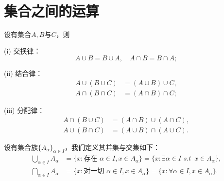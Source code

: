 \documentclass[../../main.tex]{subfiles}
\begin{document}
\section{集合之间的运算}

\begin{theorem}\label{theorem:集合运算的基本性质}
设有集合\(A,B\)与\(C\)，则

(i) 交换律：
\[A\cup B = B\cup A, \quad A\cap B = B\cap A;\]

(ii) 结合律：
\begin{align*}
  A\cup(B\cup C)&=(A\cup B)\cup C,\\
A\cap(B\cap C)&=(A\cap B)\cap C;
\end{align*}

(iii) 分配律：
\begin{align*}
A\cap(B\cup C)&=(A\cap B)\cup(A\cap C),\\
A\cup(B\cap C)&=(A\cup B)\cap(A\cup C).
\end{align*}
\end{theorem}

\begin{definition}[集族的并和交]\label{definition:集族的并和交}
设有集合族\(\{A_{\alpha}\}_{\alpha\in I}\)，我们定义其并集与交集如下：
\begin{align*}
\bigcup_{\alpha\in I}A_{\alpha}&=\{x:\text{存在 }\alpha\in I,x\in A_{\alpha}\}=\{x:\exists \alpha \in I\,\,s.t\,\,\,x\in A_{\alpha}\},\\
\bigcap_{\alpha\in I}A_{\alpha}&=\{x:\text{对一切 }\alpha\in I,x\in A_{\alpha}\}=\{x:\forall \alpha \in I,x\in A_{\alpha}\}.
\end{align*}
\end{definition}
\end{document}
